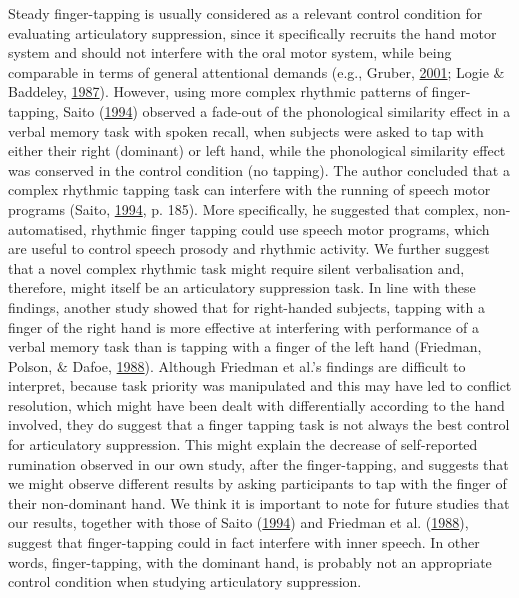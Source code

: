 \documentclass[a4paper,12pt,twoside,onecolumn,openright,final,oldfontcommands]{memoir}
\begin{document}
Steady finger-tapping is usually considered as a relevant control condition for evaluating articulatory suppression, since it specifically recruits the hand motor system and should not interfere with the oral motor system, while being comparable in terms of general attentional demands (e.g., Gruber, \protect\hyperlink{ref-gruber_effects_2001}{2001}; Logie \& Baddeley, \protect\hyperlink{ref-logie_cognitive_1987}{1987}). However, using more complex rhythmic patterns of finger-tapping, Saito (\protect\hyperlink{ref-saito_what_1994}{1994}) observed a fade-out of the phonological similarity effect in a verbal memory task with spoken recall, when subjects were asked to tap with either their right (dominant) or left hand, while the phonological similarity effect was conserved in the control condition (no tapping). The author concluded that a complex rhythmic tapping task can interfere with the running of speech motor programs (Saito, \protect\hyperlink{ref-saito_what_1994}{1994}, p. 185). More specifically, he suggested that complex, non-automatised, rhythmic finger tapping could use speech motor programs, which are useful to control speech prosody and rhythmic activity. We further suggest that a novel complex rhythmic task might require silent verbalisation and, therefore, might itself be an articulatory suppression task. In line with these findings, another study showed that for right-handed subjects, tapping with a finger of the right hand is more effective at interfering with performance of a verbal memory task than is tapping with a finger of the left hand (Friedman, Polson, \& Dafoe, \protect\hyperlink{ref-friedman_dividing_1988}{1988}). Although Friedman et al.'s findings are difficult to interpret, because task priority was manipulated and this may have led to conflict resolution, which might have been dealt with differentially according to the hand involved, they do suggest that a finger tapping task is not always the best control for articulatory suppression. This might explain the decrease of self-reported rumination observed in our own study, after the finger-tapping, and suggests that we might observe different results by asking participants to tap with the finger of their non-dominant hand. We think it is important to note for future studies that our results, together with those of Saito (\protect\hyperlink{ref-saito_what_1994}{1994}) and Friedman et al. (\protect\hyperlink{ref-friedman_dividing_1988}{1988}), suggest that finger-tapping could in fact interfere with inner speech. In other words, finger-tapping, with the dominant hand, is probably not an appropriate control condition when studying articulatory suppression.
\end{document}
